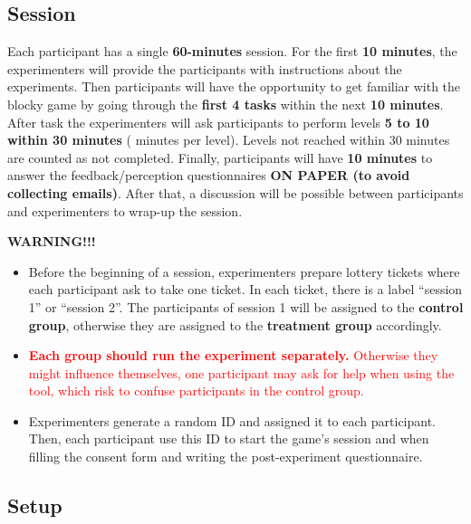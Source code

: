 \documentclass[11pt,a4paper]{article}
\begin{document}
\subsection{Session} 

Each participant has a single \textbf{60-minutes} session. 
For the first \textbf{10 minutes}, the experimenters will provide the participants with instructions about the experiments.
Then participants will have the opportunity to get familiar with the blocky game by going through the \textbf{first 4 tasks} within the next \textbf{10 minutes}.
After task the experimenters will ask participants to perform levels \textbf{5 to 10 within 30 minutes} ( minutes per level). 
Levels not reached within 30 minutes are counted as not completed. 
Finally, participants will have \textbf{10 minutes} to answer the feedback/perception questionnaires \textbf{ON PAPER (to avoid collecting emails)}. After that, a discussion will be possible between participants and experimenters to wrap-up the session.

\begin{framedtext}
\textbf{WARNING!!!}

\begin{itemize}
    \item Before the beginning of a session, experimenters prepare lottery tickets where each participant ask to take one ticket. In each ticket, there is a label ``session 1'' or ``session 2''. The participants of session 1 will be assigned to the \textbf{control group}, otherwise they are assigned to the \textbf{treatment group} accordingly. 

    \item \textcolor{red}{\textbf{Each group should run the experiment separately.} Otherwise they might influence themselves, \eg one participant may ask for help when using the tool, which risk to confuse participants in the control group.}

    \item Experimenters generate a random ID and assigned it to each participant. Then, each participant use this ID to start the game's session and when filling the consent form and writing the post-experiment questionnaire. 
\end{itemize}

\end{framedtext}

\subsection{Setup} 
\end{document}
